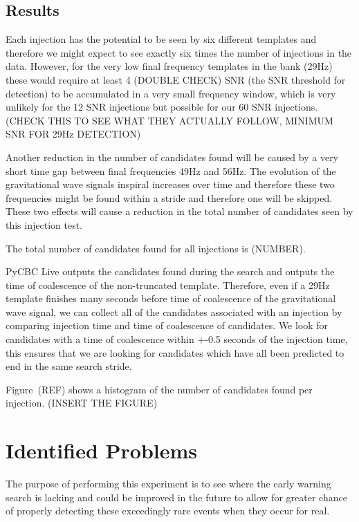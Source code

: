 \subsection{Results}

Each injection has the potential to be seen by six different templates and therefore we might expect to see exactly six times the number of injections in the data. However, for the very low final frequency templates in the bank (29Hz) these would require at least 4 (DOUBLE CHECK) SNR (the SNR threshold for detection) to be accumulated in a very small frequency window, which is very unlikely for the 12 SNR injections but possible for our 60 SNR injections. (CHECK THIS TO SEE WHAT THEY ACTUALLY FOLLOW, MINIMUM SNR FOR 29Hz DETECTION)

Another reduction in the number of candidates found will be caused by a very short time gap between final frequencies 49Hz and 56Hz. The evolution of the gravitational wave signals inspiral increases over time and therefore these two frequencies might be found within a stride and therefore one will be skipped. These two effects will cause a reduction in the total number of candidates seen by this injection test.

The total number of candidates found for all injections is (NUMBER). 

PyCBC Live outputs the candidates found during the search and outputs the time of coalescence of the non-truncated template. Therefore, even if a 29Hz template finishes many seconds before time of coalescence of the gravitational wave signal, we can collect all of the candidates associated with an injection by comparing injection time and time of coalescence of candidates. We look for candidates with a time of coalescence within +-0.5 seconds of the injection time, this ensures that we are looking for candidates which have all been predicted to end in the same search stride.

Figure~(REF) shows a histogram of the number of candidates found per injection. (INSERT THE FIGURE)

\section{Identified Problems}

The purpose of performing this experiment is to see where the early warning search is lacking and could be improved in the future to allow for greater chance of properly detecting these exceedingly rare events when they occur for real.

